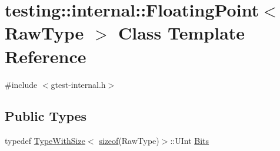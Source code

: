 \hypertarget{classtesting_1_1internal_1_1_floating_point}{}\section{testing\+:\+:internal\+:\+:Floating\+Point$<$ Raw\+Type $>$ Class Template Reference}
\label{classtesting_1_1internal_1_1_floating_point}


{\ttfamily \#include $<$gtest-\/internal.\+h$>$}

\subsection*{Public Types}
\begin{DoxyCompactItemize}
\item 
typedef \hyperlink{classtesting_1_1internal_1_1_type_with_size}{Type\+With\+Size}$<$ \hyperlink{classes__2_8js_a47ca7968904a6cccd03bb34c994adc04}{sizeof}(Raw\+Type)$>$\+::U\+Int \hyperlink{classtesting_1_1internal_1_1_floating_point_abf228bf6cd48f12c8b44c85b4971a731}{Bits}
\end{DoxyCompactItemize}
